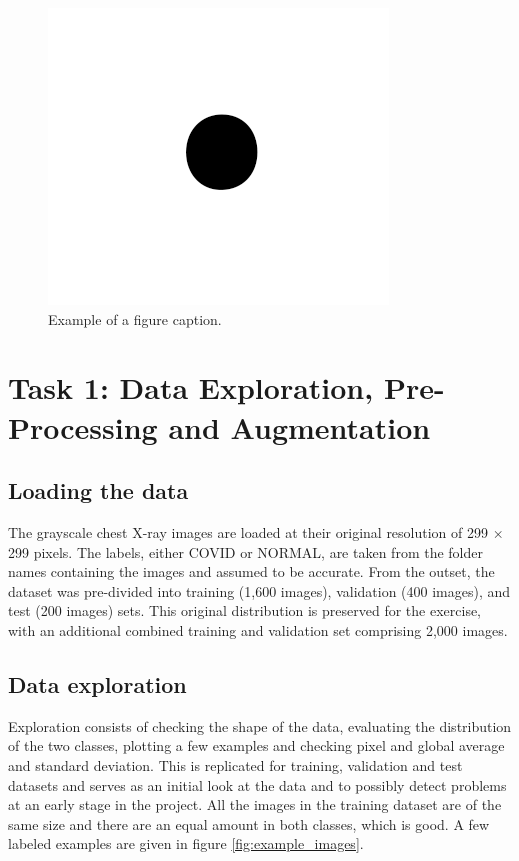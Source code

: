 \documentclass[conference]{IEEEtran}
\begin{document}
\begin{figure}[htbp]
\centerline{\includegraphics{Images/fig1.png}}
\caption{Example of a figure caption.}
\label{fig:example}
\end{figure}






\section{Task 1: Data Exploration, Pre-Processing and Augmentation}\label{sec:task_1}

\subsection{Loading the data}
The grayscale chest X-ray images are loaded at their original resolution of 299 × 299 pixels. The labels, either COVID or NORMAL, are taken from the folder names containing the images and assumed to be accurate. From the outset, the dataset was pre-divided into training (1,600 images), validation (400 images), and test (200 images) sets. This original distribution is preserved for the exercise, with an additional combined training and validation set comprising 2,000 images.

\subsection{Data exploration}
Exploration consists of checking the shape of the data, evaluating the distribution of the two classes, plotting a few examples and checking pixel and global average and standard deviation. This is replicated for training, validation and test datasets and serves as an initial look at the data and to possibly detect problems at an early stage in the project.
All the images in the training dataset are of the same size and there are an equal amount in both classes, which is good. A few labeled examples are given in figure \ref{fig:example_images}.
\end{document}

